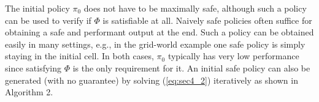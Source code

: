 \begin{remark}
The initial policy $\pi_0$ does not have to be maximally safe, although such a policy can be used to verify if $\Phi$ is  satisfiable at all. 
Naively safe policies often suffice for obtaining a safe and performant output at the end. Such a policy can be obtained easily in many settings, e.g., in the grid-world example one safe policy is simply staying in the initial cell. 
In both cases, $\pi_0$ typically has very low performance since satisfying $\Phi$ is the only requirement for it. An initial safe policy can also be generated (with no guarantee) by solving (\ref{eq:sec4_2}) iteratively as shown in Algorithm 2.
\end{remark}

